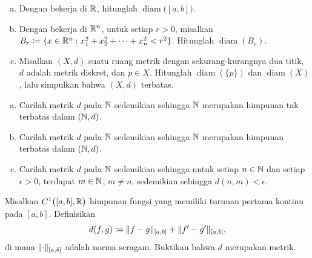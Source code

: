 \begin{exercise}
\pagebreak[2]
\leavevmode
\begin{enumerate}[a)]
\item
Dengan bekerja di ${\mathbb{R}}$, hitunglah $\operatorname{diam}\bigl([a,b]\bigr)$.
\item
Dengan bekerja di ${\mathbb{R}}^n$, untuk setiap $r > 0$, misalkan $B_r \coloneqq \{ x \in {\mathbb{R}}^n : x_1^2+x_2^2+\cdots+x_n^2
< r^2 \}$.  Hitunglah $\operatorname{diam}(B_r)$.
\item
Misalkan $(X,d)$ suatu ruang metrik dengan sekurang-kurangnya dua titik,
$d$ adalah metrik diskret, dan $p \in X$.
Hitunglah
$\operatorname{diam}(\{ p \})$ dan $\operatorname{diam}(X)$,
lalu simpulkan bahwa $(X,d)$ terbatas.
\end{enumerate}
\end{exercise}

\begin{exercise}
\pagebreak[2]
\leavevmode
\begin{enumerate}[a)]
\item
Carilah metrik $d$ pada ${\mathbb{N}}$ sedemikian sehingga ${\mathbb{N}}$ merupakan himpunan tak terbatas dalam $({\mathbb{N}},d)$.
\item
Carilah metrik $d$ pada ${\mathbb{N}}$ sedemikian sehingga ${\mathbb{N}}$ merupakan himpunan terbatas dalam $({\mathbb{N}},d)$.
\item
Carilah metrik $d$ pada ${\mathbb{N}}$ sedemikian sehingga untuk setiap $n \in {\mathbb{N}}$ dan setiap $\epsilon > 0$,
terdapat $m \in {\mathbb{N}}$, $m \neq n$, sedemikian sehingga $d(n,m) < \epsilon$.
\end{enumerate}
\end{exercise}

\begin{exercise} \label{exercise:C1ab}
Misalkan $C^1\bigl([a,b],{\mathbb{R}}\bigr)$ himpunan fungsi yang memiliki turunan pertama
kontinu pada $[a,b]$.
Definisikan
\begin{equation*}
d(f,g) \coloneqq \lVert {f-g} \rVert_{[a,b]} + \lVert {f'-g'} \rVert_{[a,b]},
\end{equation*}
di mana $\lVert {\cdot} \rVert_{[a,b]}$ adalah norma seragam.  Buktikan bahwa $d$ merupakan metrik.
\end{exercise}

